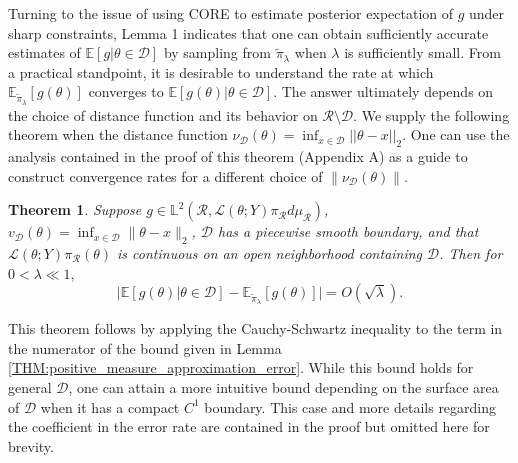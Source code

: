 \documentclass[10pt,fleqn]{article}
\newtheorem{theorem}{Theorem} \newtheorem{lemma}{Lemma}
\newcommand{\bb}[1]{\mathbb{#1}} \newcommand{\mc}[1]{\mathcal{#1}}
\DeclareMathOperator{\1}{\mathbbm{1}} \DeclareMathOperator{\bigO}{\mc O}
\begin{document}
Turning to the issue of using CORE to estimate posterior expectation of $g$ under sharp constraints, Lemma 1 indicates that one can obtain sufficiently accurate estimates of
$\bb E[g|\theta\in\mathcal{D}]$ by sampling from $\tilde{\pi}_\lambda$ when
$\lambda$ is sufficiently small.  From a practical standpoint, it is
desirable to understand the rate at which
$\bb E_{\tilde{\pi}_\lambda}[g(\theta)] $ converges to
$\bb E[g(\theta)|\theta \in\mathcal{D}]$. The answer ultimately depends on the choice of distance function and its behavior on $\mc R\setminus \mc D.$ We supply the following theorem when the distance function $\nu_{\mc D}(\theta) = \inf_{x\in\mc D}||\theta-x||_2$. One can use the analysis contained in the proof of this theorem (Appendix A) as a guide to construct convergence rates for a different choice of $\|\nu_{\mc D}(\theta)\|.$ 

\begin{theorem} \label{THM:Positive_measure_convergence_rate} Suppose $g
\in  \mathbb{L}^2(\mathcal{R},
\mathcal{L}(\theta;Y)\pi_\mathcal{R}d\mu_\mathcal{R})$,
$v_{\mc D}(\theta)= \inf_{x\in\mathcal{D}} \|\theta-x\|_2$, $\mathcal{D}$ has a piecewise smooth boundary, and that
$\mathcal{L}(\theta;Y)\pi_\mathcal{R}(\theta)$ is continuous on an
open neighborhood containing $\mathcal{D}$.  Then for $0<\lambda
\ll 1,$ $$ \big|\bb E[g(\theta) |\theta\in\mathcal{D}] -
\bb E_{\tilde{\pi}_\lambda}[g(\theta)]   \big| = O(\sqrt{\lambda}).  $$
\end{theorem} This theorem follows by applying the Cauchy-Schwartz
inequality to the term in the numerator of the bound given in Lemma
\ref{THM:positive_measure_approximation_error}.  While this bound holds for general $\mc D$, one can attain a more intuitive bound depending on the surface area of $\mathcal{D}$ when it has a compact $C^1$ boundary.  This case and more details regarding the coefficient in the error rate are contained in the proof but omitted here for brevity.
\end{document}
